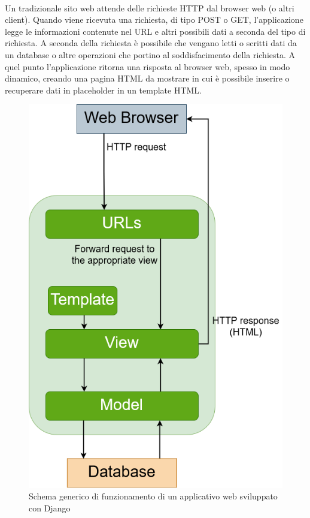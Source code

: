 \ \\
Un tradizionale sito web attende delle richieste HTTP dal browser web (o altri client). Quando viene ricevuta una richiesta, di tipo POST o GET, l'applicazione 
legge le informazioni contenute nel URL e altri possibili dati a seconda del tipo di richiesta. A seconda della richiesta è possibile che vengano letti o 
scritti dati da un database o altre operazioni che portino al soddisfacimento della richiesta. A quel punto l'applicazione ritorna una risposta al browser 
web, spesso in modo dinamico, creando una pagina HTML da mostrare in cui è possibile inserire o recuperare dati in placeholder in un template HTML.

\newpage

\begin{figure}[ht!]
    \centering
	\includegraphics[scale=0.3]{images/Django_doc.png}
	\caption{Schema generico di funzionamento di un applicativo web sviluppato con Django}
	\label{fig:django_doc}
\end{figure}
